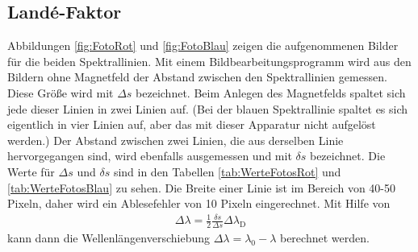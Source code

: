 \subsection{Landé-Faktor}
Abbildungen \ref{fig:FotoRot} und \ref{fig:FotoBlau} zeigen die aufgenommenen Bilder für die beiden Spektrallinien. Mit einem Bildbearbeitungsprogramm wird aus den Bildern ohne Magnetfeld der Abstand zwischen den Spektrallinien gemessen. Diese Größe wird mit $\Delta s$ bezeichnet. Beim Anlegen des Magnetfelds spaltet sich jede dieser Linien in zwei Linien auf. (Bei der blauen Spektrallinie spaltet es sich eigentlich in vier Linien auf, aber das mit dieser Apparatur nicht aufgelöst werden.) Der Abstand zwischen zwei Linien, die aus derselben Linie hervorgegangen sind, wird ebenfalls ausgemessen und mit $\delta s$ bezeichnet. Die Werte für $\Delta s$ und $\delta s$ sind in den Tabellen \ref{tab:WerteFotosRot} und \ref{tab:WerteFotosBlau} zu sehen. Die Breite einer Linie ist im Bereich von 40-50 Pixeln, daher wird ein Ablesefehler von 10 Pixeln eingerechnet. Mit Hilfe von
\begin{align}
\Delta\lambda = \frac{1}{2}\frac{\delta s}{\Delta s}\Delta\lambda_\text{D}
\end{align}
kann dann die Wellenlängenverschiebung $\Delta\lambda = \lambda_0 - \lambda$ berechnet werden.

